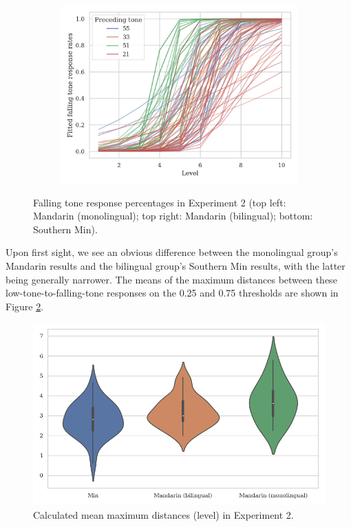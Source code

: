 \begin{figure}[hbt!]
\begin{subfigure}[b]{.45\textwidth}
\includegraphics[width=\textwidth]{figures/E2/Min_E2_raw.png}
\end{subfigure}
\caption{Falling tone response percentages in Experiment 2 (top left: Mandarin (monolingual); top right: Mandarin (bilingual); bottom: Southern Min).}
\label{Figure:E2Raw}
\end{figure}

Upon first sight, we see an obvious difference between the monolingual group's Mandarin results and the bilingual group's Southern Min results, with the latter being generally narrower. The means of the maximum distances between these low-tone-to-falling-tone responses on the 0.25 and 0.75 thresholds are shown in Figure \ref{Figure:DistBoxPlot}.

\begin{figure}[hbt!]
\centering
\includegraphics[width=\textwidth, trim={0 .5cm 0 0}]{figures/E2/Result.png}
\caption{Calculated mean maximum distances (level) in Experiment 2.}
\label{Figure:DistBoxPlot}
\end{figure}

